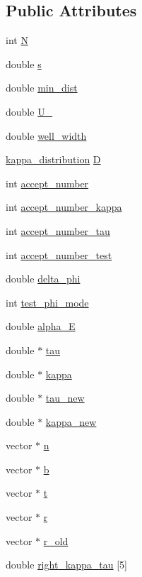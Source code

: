 \subsection*{Public Attributes}
\begin{DoxyCompactItemize}
\item 
int \hyperlink{classpolymer_a371d5df1d09118e050f192615b07a370}{N}
\item 
double \hyperlink{classpolymer_a10f77b05b8c1372afc359cccc3a231f9}{s}
\item 
double \hyperlink{classpolymer_aef88a1774e584d1c7e8f79c728e24658}{min\+\_\+dist}
\item 
double \hyperlink{classpolymer_af704fc330a4a90c5fe436ed053cb26ef}{U\+\_}
\item 
double \hyperlink{classpolymer_a6dd44a7eff4fc1ae2e2729a115278a5d}{well\+\_\+width}
\item 
\hyperlink{classkappa__distribution}{kappa\+\_\+distribution} \hyperlink{classpolymer_ab766c05cab662491c9378022b58cdda3}{D}
\item 
int \hyperlink{classpolymer_ac4f3c065dd8bb61def0439b66a15f963}{accept\+\_\+number}
\item 
int \hyperlink{classpolymer_a90b569376d792925a187b975d082a76b}{accept\+\_\+number\+\_\+kappa}
\item 
int \hyperlink{classpolymer_a3c58ebbee07ff914796243d22dd1ee5a}{accept\+\_\+number\+\_\+tau}
\item 
int \hyperlink{classpolymer_ab1be653d24606604e177a2ff13948091}{accept\+\_\+number\+\_\+test}
\item 
double \hyperlink{classpolymer_a77bd4d23130573809e2d63f424130665}{delta\+\_\+phi}
\item 
int \hyperlink{classpolymer_a0c341b176ce68b26ba1e44388f5ebcc3}{test\+\_\+phi\+\_\+mode}
\item 
double \hyperlink{classpolymer_a318e135320566c15c8a026aee0b530a4}{alpha\+\_\+E}
\item 
double $\ast$ \hyperlink{classpolymer_a314dfc1f874c4ece78eae8e5910805c4}{tau}
\item 
double $\ast$ \hyperlink{classpolymer_a1ff7101848ade779f206852df2ce9545}{kappa}
\item 
double $\ast$ \hyperlink{classpolymer_a861b0d4b1da6426c1da5a1f1cc3b7825}{tau\+\_\+new}
\item 
double $\ast$ \hyperlink{classpolymer_abf63b597d52f4549f0f6382e14d71941}{kappa\+\_\+new}
\item 
vector $\ast$ \hyperlink{classpolymer_a4af8426c4b897cffc1233bd08b72baa0}{n}
\item 
vector $\ast$ \hyperlink{classpolymer_a5d80f18b440f7d36e1b9c539ab9d64e4}{b}
\item 
vector $\ast$ \hyperlink{classpolymer_a601a9ddb7ed75e1057bccc90b4fef04f}{t}
\item 
vector $\ast$ \hyperlink{classpolymer_a4e15378873dab00e57724ffc76027804}{r}
\item 
vector $\ast$ \hyperlink{classpolymer_aeb510ad73db983d8b209ed31d9d5a88c}{r\+\_\+old}
\item 
double \hyperlink{classpolymer_a96ee2b502254698c8b7362a9cb002514}{right\+\_\+kappa\+\_\+tau} \mbox{[}5\mbox{]}
\end{DoxyCompactItemize}


